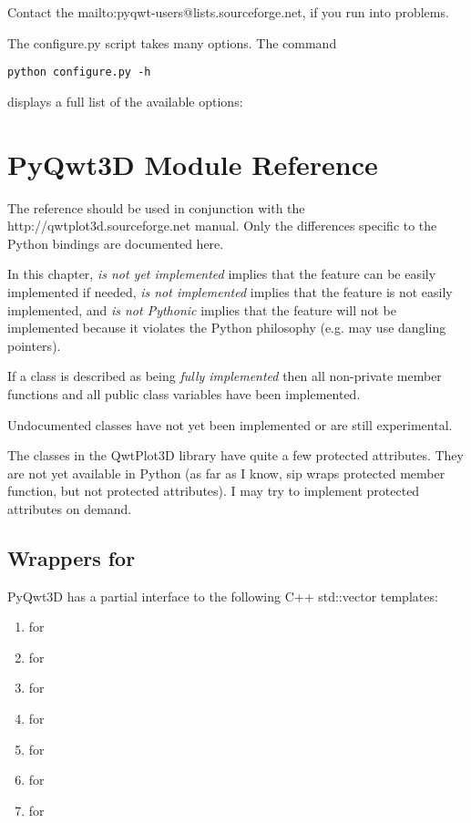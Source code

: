\documentclass{manual}
\makeatletter
\newcommand{\QwtPlotDdd}{\ulink{QwtPlot3D}
  {http://qwtplot3d.sourceforge.net}}
\newcommand{\mailinglist}{\ulink{mailing list}
  {mailto:pyqwt-users@lists.sourceforge.net}}
\makeatother
\begin{document}
Contact the \mailinglist{}, if you run into problems.

\begin{notice}[note]
  The configure.py script takes many options. The command
\begin{verbatim}
python configure.py -h
\end{verbatim}
  displays a full list of the available options:
  
\end{notice}


\chapter{PyQwt3D Module Reference \label{reference}}

The reference should be used in conjunction with the \QwtPlotDdd{} manual.
Only the differences specific to the Python bindings are documented here.

In this chapter, \emph{is not yet implemented} implies that the feature can
be easily implemented if needed, \emph{is not implemented} implies that the
feature is not easily implemented, and \emph{is not Pythonic} implies that
the feature will not be implemented because it violates the Python philosophy
(e.g. may use dangling pointers).

If a class is described as being \emph{fully implemented} then all non-private
member functions and all public class variables have been implemented.

Undocumented classes have not yet been implemented or are still experimental.

The classes in the QwtPlot3D library have quite a few protected attributes.
They are not yet available in Python (as far as I know, sip wraps protected
member function, but not protected attributes).
I may try to implement protected attributes on demand.

\section{Wrappers for }

PyQwt3D has a partial interface to the following C++ std::vector templates:
\begin{enumerate}
\item
   for 
\item
   for 
\item
   for 
\item
   for 
\item
   for 
\item
   for 
\item
   for 
\end{enumerate}
\end{document}
